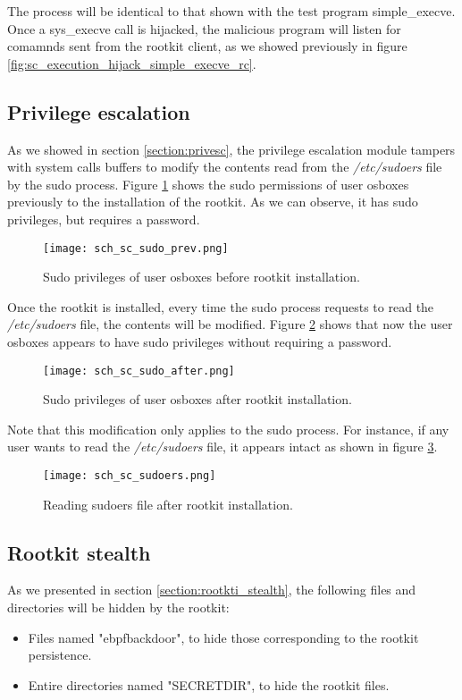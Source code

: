 The process will be identical to that shown with the test program simple\_execve. Once a sys\_execve call is hijacked, the malicious program will listen for comamnds sent from the rootkit client, as we showed previously in figure \ref{fig:sc_execution_hijack_simple_execve_rc}.


\subsection{Privilege escalation}
As we showed in section \ref{section:privesc}, the privilege escalation module tampers with system calls buffers to modify the contents read from the \textit{/etc/sudoers} file by the sudo process. Figure \ref{fig:sc_sudo_prev} shows the sudo permissions of user osboxes previously to the installation of the rootkit. As we can observe, it has sudo privileges, but requires a password.

\begin{figure}[htbp]
	\centering
	\texttt{[image: sch\_sc\_sudo\_prev.png]}
	\caption{Sudo privileges of user osboxes before rootkit installation.}
	\label{fig:sc_sudo_prev}
\end{figure}

Once the rootkit is installed, every time the sudo process requests to read the \textit{/etc/sudoers} file, the contents will be modified. Figure \ref{fig:sc_sudo_after} shows that now the user osboxes appears to have sudo privileges without requiring a password.

\begin{figure}[htbp]
	\centering
	\texttt{[image: sch\_sc\_sudo\_after.png]}
	\caption{Sudo privileges of user osboxes after rootkit installation.}
	\label{fig:sc_sudo_after}
\end{figure}

Note that this modification only applies to the sudo process. For instance, if any user wants to read the \textit{/etc/sudoers} file, it appears intact as shown in figure \ref{fig:sc_sudoers}.

\begin{figure}[htbp]
	\centering
	\texttt{[image: sch\_sc\_sudoers.png]}
	\caption{Reading sudoers file after rootkit installation.}
	\label{fig:sc_sudoers}
\end{figure}

\subsection{Rootkit stealth}
As we presented in section \ref{section:rootkti_stealth}, the following files and directories will be hidden by the rootkit:
\begin{itemize}
\item Files named "ebpfbackdoor", to hide those corresponding to the rootkit persistence.
\item Entire directories named "SECRETDIR", to hide the rootkit files.
\end{itemize}

